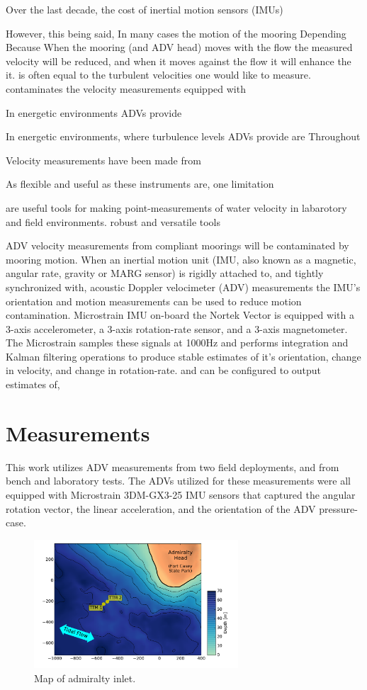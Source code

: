 \documentclass[twocol]{ametsoc}
\begin{document}
Over the last decade, the cost of inertial motion sensors (IMUs)

However, this being said,  In many cases the motion of the mooring Depending Because When the mooring (and ADV head) moves with the flow the measured velocity will be reduced, and when it moves against the flow it will enhance the it. is often equal to the turbulent velocities one would like to measure. contaminates the velocity measurements  equipped with 

In energetic environments ADVs provide 

In energetic environments, where turbulence levels ADVs provide are Throughout 

Velocity measurements have been made from 

As flexible and useful as these instruments are, one limitation 

are useful tools for making point-measurements of water velocity in labarotory and field environments. 
robust and versatile tools 

  ADV velocity measurements from compliant moorings will be contaminated by mooring motion. When an inertial motion unit (IMU, also known as a magnetic, angular rate, gravity or MARG sensor) is rigidly attached to, and tightly synchronized with, acoustic Doppler velocimeter (ADV) measurements the IMU's orientation and motion measurements can be used to reduce motion contamination.  Microstrain IMU on-board the Nortek Vector is equipped with a 3-axis accelerometer, a 3-axis rotation-rate sensor, and a 3-axis magnetometer.  The Microstrain samples these signals at 1000Hz and performs integration and Kalman filtering operations to produce stable estimates of it's orientation, change in velocity, and change in rotation-rate.  and  can be configured to output estimates of,

\section{Measurements}

This work utilizes ADV measurements from two field deployments, and from bench and laboratory tests. The ADVs utilized for these measurements were all equipped with Microstrain 3DM-GX3-25 IMU sensors that captured the angular rotation vector, the linear acceleration, and the orientation of the ADV pressure-case.  

\begin{figure}[t]
  \centering
  \includegraphics[width=3in]{map02}
  \caption{Map of admiralty inlet.}
  \label{fig:map}
\end{figure}
\end{document}

